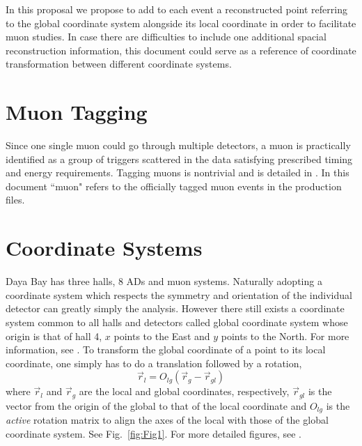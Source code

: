 \documentclass[letterpaper, 11pt]{scrartcl} %
\numberwithin{equation}{section} %
\numberwithin{figure}{section} %
\numberwithin{table}{section} %
\begin{document}
In this proposal we propose to add to each event a reconstructed point referring to the global coordinate system alongside its local coordinate in order to facilitate muon studies. In case there are difficulties to include one additional spacial reconstruction information, this document could serve as a reference of coordinate transformation between different coordinate systems.


\section{Muon Tagging}

Since one single muon could go through multiple detectors, a muon is practically identified as a group of triggers scattered in the data satisfying prescribed timing and energy requirements. Tagging muons is nontrivial and is detailed in \cite{jjling+hqlu}. In this document ``muon" refers to the officially tagged muon events in the production files.


\section{Coordinate Systems}

Daya Bay has three halls, 8 ADs and muon systems. Naturally adopting a coordinate system which respects the symmetry and orientation of the individual detector can greatly simply the analysis. However there still exists a coordinate system common to all halls and detectors called global coordinate system whose origin is that of hall 4, $x$ points to the East and $y$ points to the North. For more information, see \cite{coordsys}. To transform the global coordinate of a point to its local coordinate, one simply has to do a translation followed by a rotation,
\begin{equation}
\vec{r}_l=O_{lg}(\vec{r}_g-\vec{r}_{gl})
\end{equation}
where $\vec{r}_l$ and $\vec{r}_g$ are the local and global coordinates, respectively, $\vec{r}_{gl}$ is the vector from the origin of the global to that of the local coordinate and $O_{lg}$ is the \emph{active} rotation matrix to align the axes of the local with those of the global coordinate system. See Fig.~\ref{fig:Fig1}. For more detailed figures, see \cite{bob}.
\end{document}

